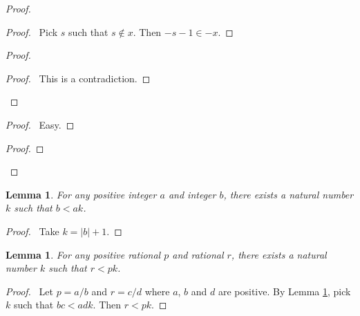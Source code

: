 \documentclass{article}
\let\qed\relax
\newtheorem{lemma}[axiom]{Lemma}
\theoremstyle{definition}
\begin{document}
    \begin{proof}
        \pf
        \begin{proof}
            \pf\ Pick $s$ such that $s \notin x$. Then $-s-1 \in -x$.
        \end{proof}
        \begin{proof}
            \qedstep
            \begin{proof}
                \pf\ This is a contradiction.
            \end{proof}
        \end{proof}
        \begin{proof}
            \pf\ Easy.
        \end{proof}
        \begin{proof}
        \end{proof}
        \qed
    \end{proof}

    \begin{lemma}
        \label{lemma:integers_Archimedean}
        For any positive integer $a$ and integer $b$, there exists a natural number $k$ such that
        $b < ak$.
    \end{lemma}

    \begin{proof}
        \pf\ Take $k = |b| + 1$. \qed
    \end{proof}

    \begin{lemma}
        \label{lemma:rationals_Archimedean}
        For any positive rational $p$ and rational $r$, there exists a natural number $k$ such that
        $r < pk$.
    \end{lemma}

    \begin{proof}
        \pf\ Let $p = a/b$ and $r = c/d$ where $a$, $b$ and $d$ are positive. By Lemma \ref{lemma:integers_Archimedean},
        pick $k$ such that $bc < adk$. Then $r < pk$. \qed
    \end{proof}
\end{document}
